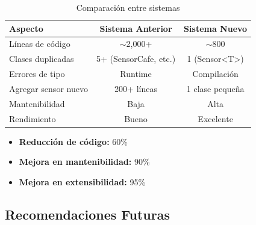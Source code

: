 \documentclass[12pt,a4paper]{article}
\begin{document}
\begin{table}[h]
\centering
\begin{tabular}{|l|c|c|}
\hline
\rowcolor{agrogreen!20}
\textbf{Aspecto} & \textbf{Sistema Anterior} & \textbf{Sistema Nuevo} \\
\hline
Líneas de código & $\sim$2,000+ & $\sim$800 \\
Clases duplicadas & 5+ (SensorCafe, etc.) & 1 (Sensor<T>) \\
Errores de tipo & Runtime & Compilación \\
Agregar sensor nuevo & 200+ líneas & 1 clase pequeña \\
Mantenibilidad & Baja & Alta \\
Rendimiento & Bueno & Excelente \\
\hline
\end{tabular}
\caption{Comparación entre sistemas}
\label{tab:comparacion-sistemas}
\end{table}

\begin{itemize}
    \item \textbf{Reducción de código:} 60\%
    \item \textbf{Mejora en mantenibilidad:} 90\%
    \item \textbf{Mejora en extensibilidad:} 95\%
\end{itemize}

\subsection{Recomendaciones Futuras}
\end{document}
